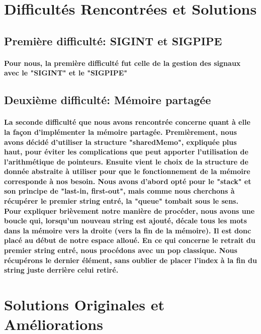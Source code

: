 \documentclass[utf8]{article}
\begin{document}
\paragraph{}

\section{Difficultés Rencontrées et Solutions}
\subsection{Première difficulté: SIGINT et SIGPIPE}
\paragraph{Pour nous, la première difficulté fut celle de la gestion des signaux avec le "SIGINT" et le "SIGPIPE"}
\subsection{Deuxième difficulté: Mémoire partagée}
\paragraph{La seconde difficulté que nous avons rencontrée concerne quant à elle la façon d'implémenter la mémoire partagée. Premièrement, nous avons décidé
d'utiliser la structure "sharedMemo", expliquée plus haut, pour éviter les complications que peut apporter l'utilisation de l'arithmétique de pointeurs. Ensuite
vient le choix de la structure de donnée abstraite à utiliser pour que le fonctionnement de la mémoire corresponde à nos besoin. Nous avons d'abord opté pour
le "stack" et son principe de "last-in, first-out", mais comme nous cherchons à récupérer le premier string entré, la "queue" tombait sous le sens. Pour expliquer
brièvement notre manière de procéder, nous avons une boucle qui, lorsqu'un nouveau string est ajouté, décale tous les mots dans la mémoire vers la droite (vers la 
fin de la mémoire). Il est donc placé au début de notre espace alloué. En ce qui concerne le retrait du premier string entré, nous procédons avec un pop classique. Nous 
récupérons le dernier élément, sans oublier de placer l'index à la fin du string juste derrière celui retiré.}

\section{Solutions Originales et Améliorations}
\end{document}
